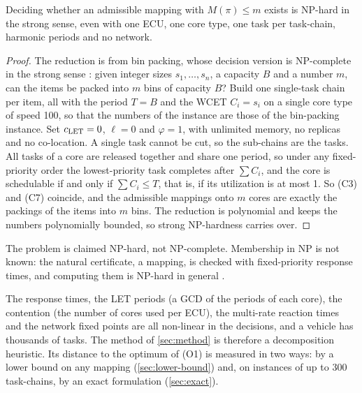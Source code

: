 \begin{proposition}[Hardness]
\label{prop:hard}
Deciding whether an admissible mapping with $M(\pi)\le m$ exists is
NP-hard in the strong sense, even with one ECU, one core type, one task
per task-chain, harmonic periods and no network.
\end{proposition}
\begin{proof}
The reduction is from bin packing, whose decision version is NP-complete
in the strong sense \cite{garey1979computers}: given integer sizes
$s_1,\dots,s_n$, a capacity $B$ and a number $m$, can the items be packed
into $m$ bins of capacity $B$? Build one single-task chain per item, all
with the period $T=B$ and the WCET $C_i=s_i$ on a single core type of speed
100, so that the numbers of the instance are those of the bin-packing
instance. Set $c_{\mathrm{LET}}=0$, $\ell=0$ and $\varphi=1$, with unlimited memory,
no replicas and no co-location. A single task cannot be cut, so the
sub-chains are the tasks. All tasks of a core are released together and
share one period, so under any fixed-priority order the lowest-priority
task completes after $\sum C_i$, and the core is schedulable if and only
if $\sum C_i\le T$, that is, if its utilization is at most 1. So (C3) and
(C7) coincide, and the admissible mappings onto $m$ cores are exactly the
packings of the items into $m$ bins. The reduction is polynomial and keeps
the numbers polynomially bounded, so strong NP-hardness carries over.
\end{proof}
The problem is claimed NP-hard, not NP-complete. Membership in NP is not
known: the natural certificate, a mapping, is checked with fixed-priority
response times, and computing them is NP-hard in general
\cite{eisenbrand2008response}.

The response times, the LET periods (a GCD of the periods of each core),
the contention (the number of cores used per ECU), the multi-rate reaction
times and the network fixed points are all non-linear in the decisions,
and a vehicle has thousands of tasks. The method of \cref{sec:method} is
therefore a decomposition heuristic. Its distance to the optimum of (O1)
is measured in two ways: by a lower bound on any mapping
(\cref{sec:lower-bound}) and, on instances of up to 300 task-chains, by an
exact formulation (\cref{sec:exact}).
